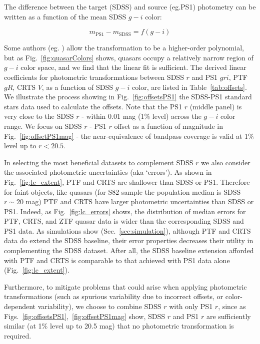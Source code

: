 \documentclass[twocolumn]{aastex62}
\begin{document}
The difference  between the target (SDSS) and source (eg.PS1) photometry can be written as a function of the mean SDSS $g-i$ color: 

\begin{equation}
m_{\mathrm{PS1}} - m_{\mathrm{SDSS}} = f(g-i)
\end{equation}

Some authors (eg. \citealt{li2018}) allow the transformation to be a higher-order polynomial, but as Fig.~\ref{fig:quasarColors} shows, quasars occupy a relatively narrow region of $g-i$ color space, and we find that the linear fit is sufficient. The derived linear coefficients for photometric transformations between SDSS $r$ and PS1 $gri$, PTF $gR$, CRTS $V$,  as a function of SDSS $g-i$ color, are listed in Table~\ref{tab:offsets}. We illustrate the process showing in Fig.~\ref{fig:offsetsPS1} the SDSS-PS1 standard stars data used to calculate the offsets. Note that the PS1 $r$ (middle panel) is very close to the SDSS $r$ - within  $0.01$ mag (1\% level) across the $g-i$ color range. We focus on SDSS $r$ - PS1 $r$ offset as a function of magnitude in Fig.~\ref{fig:offsetPS1mag} - the near-equivalence of bandpass coverage is valid at 1\% level up to $r < 20.5$. %

In selecting the most beneficial datasets to complement SDSS $r$ we also consider the associated photometric uncertainties (aka `errors'). As shown in Fig.~\ref{fig:lc_extent},  PTF and CRTS are shallower than SDSS or PS1. Therefore for faint objects, like quasars (for S82 sample the population median is SDSS $r \sim 20$ mag) PTF and CRTS have larger photometric uncertainties than SDSS or PS1. Indeed, as Fig.~\ref{fig:lc_errors} shows, the distribution of median errors for PTF, CRTS, and ZTF quasar data is wider than the corresponding SDSS and PS1 data. As simulations show (Sec.~\ref{sec:simulation}), although PTF and CRTS data do extend the SDSS baseline, their error properties decreases their utility in complementing the SDSS dataset. After all, the SDSS baseline extension afforded with PTF and CRTS is comparable to that achieved with PS1 data alone (Fig.~\ref{fig:lc_extent}). 

Furthermore, to mitigate problems that could arise when applying photometric transformations (such as spurious variability due to incorrect offsets, or color-dependent variability), we choose to combine SDSS $r$ with only PS1 $r$, since as Figs.~\ref{fig:offsetsPS1},~\ref{fig:offsetPS1mag} show, SDSS $r$ and PS1 $r$ are sufficiently similar (at 1\% level up to 20.5 mag) that no photometric transformation is required. 
\end{document}
